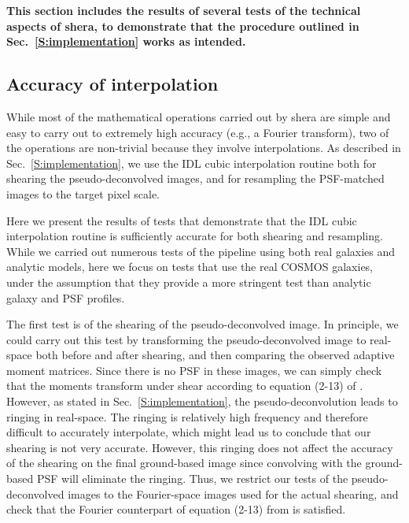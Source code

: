\documentclass[twocolumn,useAMS,usenatbib]{mn2e}
\newcommand{\reftext}[1]{\textbf{#1}}
\begin{document}
\reftext{This section includes the results of several tests of the
  technical aspects of {\sc shera}, to demonstrate that the procedure
  outlined in Sec.~\ref{S:implementation} works as intended.}

\subsection{Accuracy of interpolation}\label{SS:interpolation}

While most of the mathematical operations carried out by {\sc shera}
are simple and easy to carry out to extremely high accuracy (e.g., a
Fourier transform), two of the operations are non-trivial because they
involve interpolations.  As described in Sec.~\ref{S:implementation},
we use the IDL cubic interpolation routine both for shearing the
pseudo-deconvolved images, and for resampling the PSF-matched images
to the target pixel scale.

Here we present the results of tests that demonstrate that the IDL
cubic interpolation routine is sufficiently accurate for both shearing
and resampling.  While we carried out numerous tests of the pipeline
using both real galaxies and analytic models, here we focus on tests
that use the real COSMOS galaxies, under the assumption that they
provide a more stringent test than analytic galaxy and PSF profiles.

The first test is of the shearing of the pseudo-deconvolved image.  In
principle, we could carry out this test by transforming the
pseudo-deconvolved image to real-space both before and after shearing,
and then comparing the observed adaptive moment matrices.  Since there
is no PSF in these images, we can simply check that the moments
transform under shear according to equation (2-13) of
\cite{2002AJ....123..583B}.  However, as
stated in Sec.~\ref{S:implementation}, the pseudo-deconvolution leads
to ringing in real-space.  The ringing is relatively high frequency
and therefore difficult to accurately interpolate, which might lead us
to conclude that our shearing is not very accurate.  However, this
ringing does not
affect the accuracy of the shearing on the final ground-based image
since convolving with the ground-based PSF will eliminate the
ringing.  Thus, we restrict our tests of the pseudo-deconvolved images
to the Fourier-space images used for the actual shearing, and check that the Fourier counterpart of
equation (2-13) from \cite{2002AJ....123..583B} is satisfied.
\end{document}
